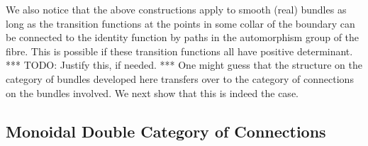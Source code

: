 \documentclass{amsart}
\newcommand{\TODO}[1]{{\color{blue!55!black} *** TODO: #1 ***}}
\numberwithin{thm}{section}
\theoremstyle{definition}
\begin{document}
We also notice that the above constructions apply to smooth (real) bundles as
long as the transition functions at the points in some collar of the boundary
can be connected to the identity function by paths in the automorphism group of
the fibre. This is possible if these transition functions all have positive
determinant. \TODO{Justify this, if needed.} One might guess that the
structure on the category of bundles developed here transfers over to the
category of connections on the bundles involved. We next show that this is
indeed the case.

%

\subsection{Monoidal Double Category of Connections}
\end{document}
